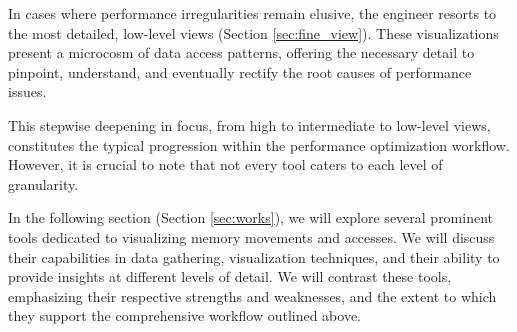 In cases where performance irregularities remain elusive, the engineer resorts to the most detailed, low-level views (Section \ref{sec:fine_view}). These visualizations present a microcosm of data access patterns, offering the necessary detail to pinpoint, understand, and eventually rectify the root causes of performance issues.

This stepwise deepening in focus, from high to intermediate to low-level views, constitutes the typical progression within the performance optimization workflow. However, it is crucial to note that not every tool caters to each level of granularity.

In the following section (Section \ref{sec:works}), we will explore several prominent tools dedicated to visualizing memory movements and accesses. We will discuss their capabilities in data gathering, visualization techniques, and their ability to provide insights at different levels of detail. We will contrast these tools, emphasizing their respective strengths and weaknesses, and the extent to which they support the comprehensive workflow outlined above.